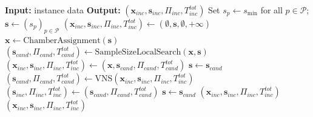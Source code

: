 \documentclass[11pt]{article}
\begin{document}
\begin{algorithm}[H]
\caption{Overall Solution Framework}
\label{alg:framework}
\label{alg:integrated_short}
\begin{algorithmic}[1]
\State \textbf{Input:} instance data
\State \textbf{Output:} \((\mathbf{x}_{inc},\mathbf{s}_{inc},\Pi_{inc},T^{tot}_{inc})\)
\State Set \(s_p\leftarrow s_{\min}\) for all \(p\in\mathcal{P}\); \(\mathbf{s}\leftarrow(s_p)_{p\in\mathcal{P}}\) \label{step:fw-init}
\State \((\mathbf{x}_{inc},\mathbf{s}_{inc},\Pi_{inc},T^{tot}_{inc})\leftarrow(\emptyset,\mathbf{s},\emptyset,+\infty)\)
    \State \(\mathbf{x}\leftarrow\text{ChamberAssignment}(\mathbf{s})\) \label{step:fw-assign}
    \State \((\mathbf{s}_{cand},\Pi_{cand},T^{tot}_{cand})\leftarrow\text{SampleSizeLocalSearch}(\mathbf{x},\mathbf{s})\) \label{step:fw-ls}
     \label{step:fw-lex}
        \State \((\mathbf{x}_{inc},\mathbf{s}_{inc},\Pi_{inc},T^{tot}_{inc})\leftarrow(\mathbf{x},\mathbf{s}_{cand},\Pi_{cand},T^{tot}_{cand})\)
        \State \(\mathbf{s}\leftarrow\mathbf{s}_{cand}\)
    \Else
        \State \((\mathbf{s}_{cand},\Pi_{cand},T^{tot}_{cand})\leftarrow\text{VNS}(\mathbf{x}_{inc},\mathbf{s}_{inc},\Pi_{inc},T^{tot}_{inc})\) \label{step:fw-vns}
            \State \((\mathbf{s}_{inc},\Pi_{inc},T^{tot}_{inc})\leftarrow(\mathbf{s}_{cand},\Pi_{cand},T^{tot}_{cand})\)
            \State \(\mathbf{s}\leftarrow\mathbf{s}_{cand}\)
        \Else
            \State \Return \((\mathbf{x}_{inc},\mathbf{s}_{inc},\Pi_{inc},T^{tot}_{inc})\) \label{step:fw-stop}
        \EndIf
    \EndIf
\EndFor
\State \Return \((\mathbf{x}_{inc},\mathbf{s}_{inc},\Pi_{inc},T^{tot}_{inc})\)
\end{algorithmic}
\end{algorithm}
\end{document}
